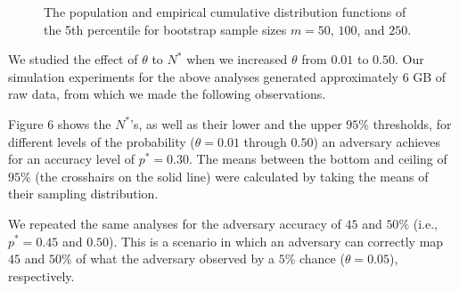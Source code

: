 \documentclass[ ../main.tex]{subfiles}
\begin{document}
\begin{figure}
\centering
{}
\hfill
{}
\hfill
{}
\caption{The population and empirical cumulative distribution functions of the 5th percentile for bootstrap sample sizes $m = 50$, $100$, and $250$.}
\label{fig:pop_vs_emp_cdf}
\end{figure}

We studied the effect of $\theta$ to $N^*$ when we increased $\theta$ from $0.01$ to $0.50$. Our simulation experiments for the above analyses generated approximately $6$ GB of raw data, from which we made the following observations.

Figure 6 shows the $N^*$'s, as well as their lower and the upper $95\%$ thresholds, for different levels of the probability ($\theta = 0.01$ through $0.50$) an adversary achieves for an accuracy level of $p^* = 0.30$. The means between the bottom and ceiling of $95\%$ \CI (the crosshairs on the solid line) were calculated by taking the means of their sampling distribution.

We repeated the same analyses for the adversary accuracy of $45$ and $50\%$ (i.e., $p^* = 0.45$ and $0.50$). This is a scenario in which an adversary can correctly map $45$ and $50\%$ of what the adversary observed by a $5\%$ chance ($\theta = 0.05$), respectively.
\end{document}
